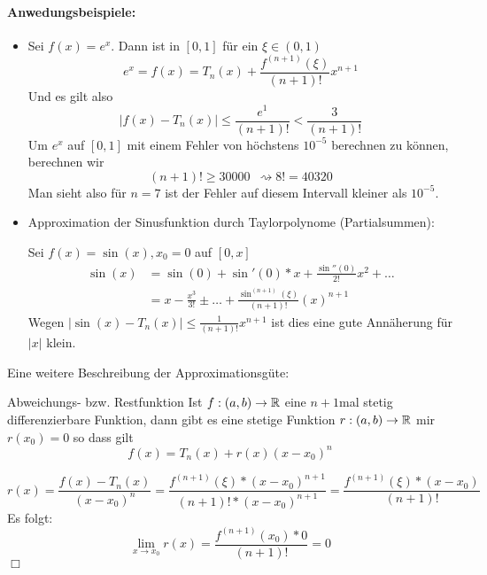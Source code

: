 \paragraph{Anwedungsbeispiele:}
\begin{itemize}
	\item Sei $f(x)=e^x$. Dann ist in $[0,1]$ für ein $\xi\in(0,1)$
	\begin{equation*}
		e^x=f(x)=T_n(x)+\frac{f^{(n+1)}(\xi)}{(n+1)!}x^{n+1}
	\end{equation*}
	Und es gilt also
	\begin{equation*}
		|f(x)-T_n(x)|\leq \frac{e^1}{(n+1)!}<\frac{3}{(n+1)!}
	\end{equation*}
	Um $e^x$ auf $[0,1]$ mit einem Fehler von höchstens $10^{-5}$ berechnen zu können, berechnen wir
	\begin{equation*}
		(n+1)!\geq 30000 \enspace\rightsquigarrow8!=40320
	\end{equation*}
	Man sieht also für $n=7$ ist der Fehler auf diesem Intervall kleiner als $10^{-5}$.
	\item Approximation der Sinusfunktion durch Taylorpolynome (Partialsummen):

	Sei $f(x)=\sin(x), x_0=0$ auf $[0,x]$
	\begin{align*}
		\sin(x)&=\sin(0)+\sin'(0)*x+\frac{\sin''(0)}{2!}x^2+\ldots\\
		&=x-\frac{x^3}{3!}\pm\ldots +\frac{\sin^{(n+1)}(\xi)}{(n+1)!}(x)^{n+1}
	\end{align*}
	Wegen $|\sin(x)-T_n(x)|\leq \frac{1}{(n+1)!}x^{n+1}$ ist dies eine gute Annäherung für $|x|$ klein.
\end{itemize}

Eine weitere Beschreibung der Approximationsgüte:
\begin{lemma}{Abweichungs- bzw. Restfunktion}
	Ist $f:(a,b)\rightarrow \mathbb{R}$ eine $n+1$mal stetig differenzierbare Funktion, dann gibt es eine stetige Funktion $r:(a,b)\rightarrow \mathbb{R}$ mir $r(x_0)=0$ so dass gilt
	\begin{equation*}
		f(x)=T_n(x)+r(x)(x-x_0)^n
	\end{equation*}
\end{lemma}
\begin{beweis}
	\begin{equation*}
		r(x)=\frac{f(x)-T_n(x)}{(x-x_0)^n}=\frac{f^{(n+1)}(\xi)*(x-x_0)^{n+1}}{(n+1)!*(x-x_0)^{n+1}}=\frac{f^{(n+1)}(\xi)*(x-x_0)}{(n+1)!}
	\end{equation*}
	Es folgt:
	\begin{equation*}
		\lim\limits_{x\to x_0}r(x)=\frac{f^{(n+1)}(x_0)*0}{(n+1)!}=0
	\end{equation*}
	\hfill$\Box$
\end{beweis}

